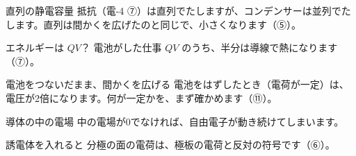 \begin{tsumazuki}{直列の静電容量}
抵抗（電-4 ⑦）は直列でたしますが、コンデンサーは並列でたします。直列は間かくを広げたのと同じで、小さくなります（⑤）。
\end{tsumazuki}

\begin{tsumazuki}{エネルギーは $QV$？}
電池がした仕事 $QV$ のうち、半分は導線で熱になります（⑦）。
\end{tsumazuki}

\begin{tsumazuki}{電池をつないだまま、間かくを広げる}
電池をはずしたとき（電荷が一定）は、電圧が2倍になります。何が一定かを、まず確かめます（⑪）。
\end{tsumazuki}

\begin{tsumazuki}{導体の中の電場}
中の電場が0でなければ、自由電子が動き続けてしまいます。
\end{tsumazuki}

\begin{tsumazuki}{誘電体を入れると}
分極の面の電荷は、極板の電荷と反対の符号です（⑥）。
\end{tsumazuki}


